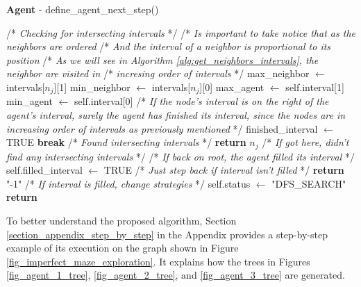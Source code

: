 \begin{algorithm}
\ContinuedFloat
\caption{\textbf{Agent} - define\_agent\_next\_step()}
\begin{algorithmic}
        \State
        \State /* \textit{Checking for intersecting intervals} */
        \State /* \textit{Is important to take notice that as the neighbors are ordered}
        \State /* \textit{And the interval of a neighbor is proportional to its position}
        \State /* \textit{As we will see in Algorithm \ref{alg:get_neighbors_intervals}, the neighbor are visited in}
        \State /* \textit{incresing order of intervals} */
            \State max\_neighbor $\gets$ intervals[$n_{j}$][1]
            \State min\_neighbor $\gets$ intervals[$n_{j}$][0]
            \State max\_agent $\gets$ self.interval[1]
            \State min\_agent $\gets$ self.interval[0]
            \State
                \State 
                \State /* \textit{If the node's interval is on the right of the agent's interval, surely the}
                \State \textit{agent has finished its interval, since the nodes are in increasing order of}
                \State \textit{intervals as previously mentioned} */
                \State finished\_interval $\gets$ TRUE
                \State \textbf{break}
                \State /* \textit{Found intersecting intervals} */
                \State \textbf{return} $n_{j}$
            \EndIf
        \EndFor
        \State
        \State /* \textit{If got here, didn't find any intersecting intervals } */
        \State /* \textit{If back on root, the agent filled its interval } */
            \State self.filled\_interval $\gets$ TRUE
        \EndIf
        \State
        \State /* \textit{Just step back if interval isn't filled} */
            \State \textbf{return} "-1"
        \EndIf
        \State
        \State /* \textit{If interval is filled, change strategies} */
        \State self.status $\gets$ "DFS\_SEARCH"
        \State \textbf{return}
    \EndProcedure
\end{algorithmic}
\end{algorithm}

To better understand the proposed algorithm, Section \ref{section_appendix_step_by_step} in the Appendix provides a step-by-step example of its execution on the graph shown in Figure \ref{fig_imperfect_maze_exploration}. It explains how the trees in Figures \ref{fig_agent_1_tree}, \ref{fig_agent_2_tree}, and \ref{fig_agent_3_tree} are generated.

